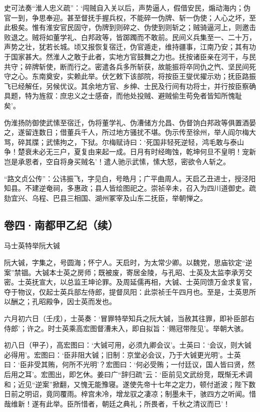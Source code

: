 \documentclass[]{article}
\begin{document}
史可法奏``淮人忠义疏''：`闯贼自入关以后，声势逼人，假借安民，煽动海内；伪官一到，争思奉迎。甚至督抚手握兵权，不能碎一伪牌、斩一伪使；人心之坏，至此极矣。惟有淮安官民固守，伪牌到则碎之、伪使到则斩之；贼骑逼河上，则邀击败退之。贼将如董学礼、白邦政等，皆踯躅而不敢前。民间义兵集至一、二十万，声势之壮，犹若长城。顷又报恢复宿迁，伪官遁走，维持疆事，江南乃安；其有功于国家甚大。然淮人之敢于此者，实地方官鼓舞之力也。抚按诸臣亲在河干，与民共守；碎牌斩使，断而行之。密遣各兵多所斩获，故能振将卒同仇之忾、坚民间死守之心。东南奠安，实赖此举。伏乞敕下该部院，将按臣王燮优擢示劝；抚臣路振飞已经解任，另候优议。其余地方官、乡绅、士民及行间有功将士，并行按臣察确具题，特为旌叙：庶忠义之士感奋，而他处投贼、避贼偷生苟免者皆知所愧耻矣'。

伪淮扬防御使武愫至宿迁，伪将董学礼、伪漕储方允昌、伪督饷白邦政等俱置酒晏之，遂留连数日；借董兵千人，所过地方骚扰不堪。伪示传至徐州，举人阎尔梅大骂，碎其牒；武愫拘之，下狱。尔梅赋诗曰：`死国非轻死逆轻，鸿毛敢与泰山争！楚衰未必无三户，夏复由来起一成。日月有时经晦蚀，乾坤何旦不皇明！宠新岂是承恩者，空自将身买贼名'！遣人驰示武愫，愫大怒，密欲令人斩之。

``路文贞公传''：公讳振飞，字见白，号皓月；广平曲周人。天启乙丑进士，授泾阳知县。不建逆奄祠，多惠政；县人皆绘图祀之。崇祯辛未，召入为四川道御史。疏劾宜兴、乌程、巴县三相国、湖州冢宰及山东二抚臣，举朝惮之。

\hypertarget{header-n32}{%
\subsection{卷四·南都甲乙纪（续）}\label{header-n32}}

马士英特举阮大铖

阮大铖，字集之，号圆海；怀宁人。天启时，为太常少卿。以魏党，思庙钦定``逆案''禁锢。大铖本士英之房师；既被废，寄居金陵，与孔昭、士英及太监李承芳交密。士英抚宣大，以总监王坤论罪。及周延儒再相，大铖、士英同馈万金求复官，夺于物议，仅起士英兵部左侍郎，提督凤阳：此崇祯壬午四月也。至是，士英思所以酬之；孔昭殿争，因士英而发也。

六月初六日（壬戌），士英奏：`冒罪特举知兵之阮大铖，当赦其往罪，即补臣部右侍郎'；许之。时士英乘高宏图督漕未入，即自拟旨：`赐冠带陛见'。举朝大骇。

初八日（甲子），高宏图曰：`大铖可用，必须九卿会议'。士英曰：`会议，则大铖必得用'。宏图曰：`臣非阻大铖；旧制：京堂必会议，乃于大铖更光明'。士英曰：`臣非受其贿，何所不光明'？宏图曰：`何必受贿；一付廷议，国人皆曰贤，然后用之耳'。宏图出，即乞休。姜曰广``辞归疏''云：`臣前见文武纷竞，既惭无术调和；近见``逆案''掀翻，又愧无能豫寝。遂使先帝十七年之定力，顿付逝波；陛下数日前之明诏，竟同覆雨。梓宫未冷，增龙驭之凄凉；制墨未干，骇四方之听闻。惜哉维新！遂有此举。臣所惜者，朝廷之典礼；所畏者，千秋之清议而已'！
\end{document}
